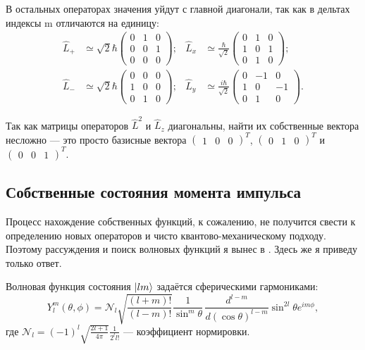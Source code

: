 В остальных операторах значения уйдут с главной диагонали, так как в дельтах
индексы m отличаются на единицу:
\begin{align*}
  \hat{L}_+ &\simeq \sqrt{2} \hbar \begin{pmatrix}
    0 & 1 & 0 \\ 0 & 0 & 1 \\ 0 & 0 & 0
  \end{pmatrix}; &
  \hat{L}_x &\simeq \frac{\hbar}{\sqrt{2}} \begin{pmatrix}
    0 & 1 & 0 \\ 1 & 0 & 1 \\ 0 & 1 & 0
  \end{pmatrix}; \\
  \hat{L}_- &\simeq \sqrt{2} \hbar \begin{pmatrix}
    0 & 0 & 0 \\ 1 & 0 & 0 \\ 0 & 1 & 0
  \end{pmatrix}; &
  \hat{L}_y &\simeq \frac{i\hbar}{\sqrt{2}} \begin{pmatrix}
    0 & -1 & 0 \\ 1 & 0 & -1 \\ 0 & 1 & 0
  \end{pmatrix}.
\end{align*}

Так как матрицы операторов $\hat{L}^2$ и $\hat{L}_z$ диагональны, найти их
собственные вектора несложно --- это просто базисные вектора $\begin{pmatrix} 1 & 0 & 0 \end{pmatrix}^T$, $\begin{pmatrix} 0 & 1 & 0 \end{pmatrix}^T$ и $\begin{pmatrix} 0 & 0 & 1 \end{pmatrix}^T$.
\qedsq

\subsection{Собственные состояния момента импульса}
Процесс нахождение собственных функций, к сожалению, не получится свести к
определению новых операторов и чисто квантово-механическому подходу. Поэтому
рассуждения и поиск волновых функций я вынес в . Здесь же я
приведу только ответ.

Волновая функция состояния $\lvert lm\rangle$ задаётся сферическими гармониками:
\[
  Y^m_l(\theta, \phi) = \mathcal{N}_l\sqrt{\frac{(l+m)!}{(l-m)!}} \frac{1}{\sin^{m}\theta}\,\frac{d^{l-m}}{d(\cos\theta)^{l-m}}\sin^{2l}\theta e^{im\phi},
\]
где $\mathcal{N}_l = (-1)^l \sqrt{\frac{2l+1}{4\pi}}\frac{1}{2^l l!}$ ---
коэффициент нормировки.

